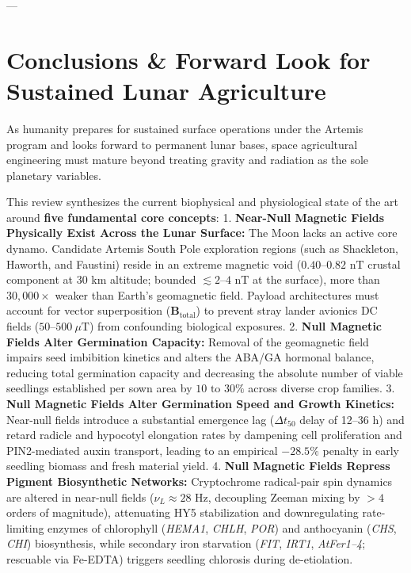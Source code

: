 \documentclass[default,sn-nature,iicol]{sn-jnl}
\begin{document}



---


\section{Conclusions \& Forward Look for Sustained Lunar Agriculture}

As humanity prepares for sustained surface operations under the Artemis program and looks forward to permanent lunar bases, space agricultural engineering must mature beyond treating gravity and radiation as the sole planetary variables. 

This review synthesizes the current biophysical and physiological state of the art around \textbf{five fundamental core concepts}:
1. \textbf{Near-Null Magnetic Fields Physically Exist Across the Lunar Surface:} The Moon lacks an active core dynamo. Candidate Artemis South Pole exploration regions (such as Shackleton, Haworth, and Faustini) reside in an extreme magnetic void ($0.40\text{--}0.82\text{ nT}$ crustal component at 30 km altitude; bounded $\lesssim 2\text{--}4\text{ nT}$ at the surface), more than $30,000\times$ weaker than Earth’s geomagnetic field. Payload architectures must account for vector superposition ($\mathbf{B}_{\text{total}}$) to prevent stray lander avionics DC fields ($50\text{--}500\ \mu\text{T}$) from confounding biological exposures.
2. \textbf{Null Magnetic Fields Alter Germination Capacity:} Removal of the geomagnetic field impairs seed imbibition kinetics and alters the ABA/GA hormonal balance, reducing total germination capacity and decreasing the absolute number of viable seedlings established per sown area by $10\text{ to }30\%$ across diverse crop families.
3. \textbf{Null Magnetic Fields Alter Germination Speed and Growth Kinetics:} Near-null fields introduce a substantial emergence lag ($\Delta t_{50}$ delay of 12--36 h) and retard radicle and hypocotyl elongation rates by dampening cell proliferation and PIN2-mediated auxin transport, leading to an empirical $-28.5\%$ penalty in early seedling biomass and fresh material yield.
4. \textbf{Null Magnetic Fields Repress Pigment Biosynthetic Networks:} Cryptochrome radical-pair spin dynamics are altered in near-null fields ($\nu_L \approx 28\text{ Hz}$, decoupling Zeeman mixing by $>4$ orders of magnitude), attenuating HY5 stabilization and downregulating rate-limiting enzymes of chlorophyll (\textit{HEMA1}, \textit{CHLH}, \textit{POR}) and anthocyanin (\textit{CHS}, \textit{CHI}) biosynthesis, while secondary iron starvation (\textit{FIT}, \textit{IRT1}, \textit{AtFer1--4}; rescuable via Fe-EDTA) triggers seedling chlorosis during de-etiolation.
\end{document}
